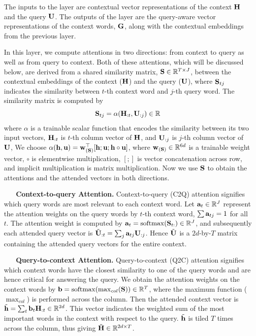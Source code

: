 The inputs to the layer are contextual vector representations of the context ${\bf H}$ and the query ${\bf U}$. 
The outputs of the layer are the query-aware vector representations of the context words, ${\bf G}$, along with the contextual embeddings from the previous layer.

In this layer, we compute attentions in two directions: from context to query as well as from query to context. 
Both of these attentions, which will be discussed below, are derived from a shared similarity matrix, ${\bf S} \in \mathbb{R}^{T \times J}$, between the contextual embeddings of the context (${\bf H}$) and the query (${\bf U}$), 
where ${\bf S}_{tj}$ indicates the similarity between $t$-th context word and $j$-th query word.
The similarity matrix is computed by
\begin{equation}\label{eqn:sim}
{\bf S}_{tj} = \alpha({\bf H}_{:t}, {\bf U}_{:j}) \in \mathbb{R}
\end{equation}
where $\alpha$ is a trainable scalar function that encodes the similarity between its two input vectors,
${\bf H}_{:t}$ is $t$-th column vector of ${\bf H}$, and
${\bf U}_{:j}$ is $j$-th column vector of ${\bf U}$,
We choose $\alpha({\bf h}, {\bf u}) = {\bf w}^\top_{({\bf S})} [{\bf h}; {\bf u}; {\bf h} \circ {\bf u}]$,
where ${\bf w}_{({\bf S})} \in \mathbb{R}^{6d}$ is a trainable weight vector, 
$\circ$ is elementwise multiplication,
$[;]$ is vector concatenation across row,
and implicit multiplication is matrix multiplication.
Now we use ${\bf S}$ to obtain the attentions and the attended vectors in both directions.

\textbf{\ \ \ Context-to-query Attention.} 
Context-to-query (C2Q) attention signifies which query words are most relevant to each context word.
Let ${\bf a}_t \in \mathbb{R}^J$ represent the attention weights on the query words by $t$-th context word, $\sum {\bf a}_{tj} = 1$ for all $t$. The attention weight is computed by ${\bf a}_t = \mathrm{softmax}({\bf S}_{t:}) \in \mathbb{R}^J$,
and subsequently each attended query vector is $\tilde{{\bf U}}_{:t} = \sum_j {\bf a}_{tj} {\bf U}_{:j}$.
Hence $\tilde{{\bf U}}$ is a $2d$-by-$T$ matrix containing the attended query vectors for the entire context.

\textbf{\ \ \ Query-to-context Attention.}
Query-to-context (Q2C) attention signifies which context words have the closest similarity to one of the query words and are hence critical for answering the query. We obtain the attention weights on the context words by ${\bf b} = \mathrm{softmax}(\max_{col} ({\bf S})) \in \mathbb{R}^T$, where the maximum function ($\max_{col}$) is performed across the column. Then the attended context vector is $\tilde{\bf h} = \sum_t {\bf b}_t {\bf H}_{:t} \in \mathbb{R}^{2d}$. This vector  indicates the weighted sum of the most important words in the context with respect to the query.
$\tilde{\bf h}$ is tiled $T$ times across the column, thus giving $\tilde{\bf H} \in \mathbb{R}^{2d \times T}$.


